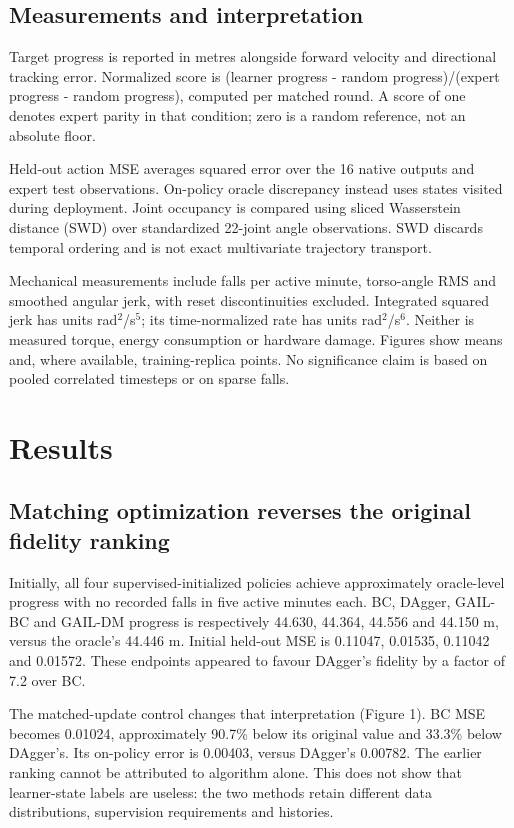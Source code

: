 \documentclass[10pt,a4paper,twocolumn]{article}
\begin{document}
\subsection{Measurements and interpretation}

Target progress is reported in metres alongside forward velocity and directional tracking error. Normalized score is (learner progress - random progress)/(expert progress - random progress), computed per matched round. A score of one denotes expert parity in that condition; zero is a random reference, not an absolute floor.

Held-out action MSE averages squared error over the 16 native outputs and expert test observations. On-policy oracle discrepancy instead uses states visited during deployment. Joint occupancy is compared using sliced Wasserstein distance (SWD) over standardized 22-joint angle observations. SWD discards temporal ordering and is not exact multivariate trajectory transport.

Mechanical measurements include falls per active minute, torso-angle RMS and smoothed angular jerk, with reset discontinuities excluded. Integrated squared jerk has units rad$^2$/s$^5$; its time-normalized rate has units rad$^2$/s$^6$. Neither is measured torque, energy consumption or hardware damage. Figures show means and, where available, training-replica points. No significance claim is based on pooled correlated timesteps or on sparse falls.

\section{Results}

\subsection{Matching optimization reverses the original fidelity ranking}

Initially, all four supervised-initialized policies achieve approximately oracle-level progress with no recorded falls in five active minutes each. BC, DAgger, GAIL-BC and GAIL-DM progress is respectively 44.630, 44.364, 44.556 and 44.150 m, versus the oracle's 44.446 m. Initial held-out MSE is 0.11047, 0.01535, 0.11042 and 0.01572. These endpoints appeared to favour DAgger's fidelity by a factor of 7.2 over BC.

The matched-update control changes that interpretation (Figure 1). BC MSE becomes 0.01024, approximately 90.7\% below its original value and 33.3\% below DAgger's. Its on-policy error is 0.00403, versus DAgger's 0.00782. The earlier ranking cannot be attributed to algorithm alone. This does not show that learner-state labels are useless: the two methods retain different data distributions, supervision requirements and histories.
\end{document}

